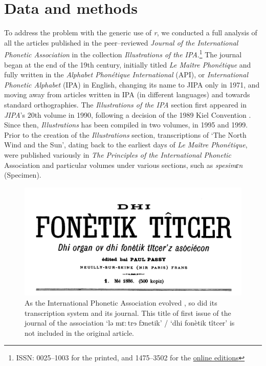 \section{Data and methods}

To address the problem with the generic use of \textit{r}, we conducted a full analysis of all the articles published in the peer–reviewed \textit{Journal of the International Phonetic Association} in the collection \textit{Illustrations of the IPA}.\footnote{ISSN: 0025–1003 for the printed, and 1475–3502 for the \href{https://www.cambridge.org/core/journals/journal-of-the-international-phonetic-association}{online editions}}
The journal began at the end of the 19th century, initially titled \textit{Le Maître Phonétique} and fully written in the \textit{Alphabet Phonétique International} (API), or \textit{International Phonetic Alphabet} (IPA) in English, changing its name to JIPA only in 1971, and moving away from articles written in IPA (in different languages) and towards standard orthographies. The \textit{Illustrations of the IPA} section first appeared in \textit{JIPA}'s 20th volume in 1990, following a decision of the 1989 Kiel Convention \parencites[77--80]{ipaIllustrationsIPA1990,roachReport1989Kiel1989}. Since then, \textit{Illustrations} has been compiled in two volumes, in 1995 and 1999. Prior to the creation of the \textit{Illustrations} section, transcriptions of ‘The North Wind and the Sun’, dating back to the earliest days of \textit{Le Maître Phonétique}, were published variously in \textit{The Principles of the International Phonetic} Association \parencite{ipaPrinciplesInternationalPhonetic1949} and particular volumes under various sections, such as \textit{spesimɛn} (Specimen).\\

\begin{figure}
	\centering
	\includegraphics[width=1\linewidth]{jipa/images/phonetic_teacher}
	\caption[Illustration of the title of first issue of the journal of the association ‘lə mɛ${:}$trɘ fɔnetik’]{As the International Phonetic Association evolved \parencite{esling40thAnniversaryJIPA2010}, so did its transcription system and its journal. This title of first issue of the journal of the association ‘lə mɛ${:}$trɘ fɔnetik’ / ‘dhi fonètik tîtcer’ is not included in the original article.}
	\label{fig:phoneticteacher}
\end{figure}

